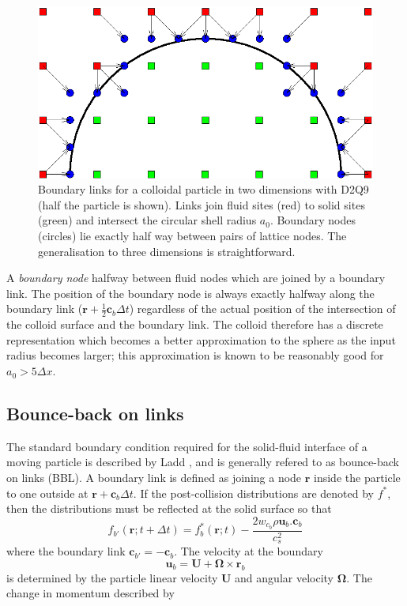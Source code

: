 \begin{figure}[tb]
\begin{center}
\includegraphics{xfig/colloidhalflinksnew.eps}
\end{center}
\caption{Boundary links for a colloidal particle in two dimensions
with D2Q9 (half the particle is shown). Links join fluid sites (red)
to solid sites (green) and
intersect the circular shell radius $a_0$. Boundary nodes (circles)
lie exactly half way between pairs of lattice nodes. The generalisation
to three dimensions is straightforward.}
\label{fig_coll2}
\end{figure}

A \textit{boundary node} halfway between fluid nodes which are joined
by a boundary link. The position of the boundary node is always
exactly halfway along the boundary link ($\mathbf{r} + \frac{1}{2}\mathbf{c}_b
\Delta t$) regardless of the actual position of the intersection
of the colloid surface and the boundary link.
The colloid therefore has a discrete representation which becomes a
better approximation to the sphere as the input radius becomes larger;
this approximation is known to be reasonably good for $a_0 > 5\Delta x$.



\subsection{Bounce-back on links}

The standard boundary condition required for the solid-fluid
interface of a moving particle is described by Ladd \cite{l94b},
and is generally refered to as bounce-back on links (BBL).
A boundary link is defined as joining a node $\mathbf{r}$
inside the particle to one outside at $\mathbf{r} + \mathbf{c}_b \Delta t$.
If the post-collision distributions are denoted by $f^\ast$, then
the distributions must be reflected at the solid surface so that
\begin{equation}
\label{eq:bbl1}
f_{b'}(\mathbf{r}; t + \Delta t) = f_b^\ast (\mathbf{r}; t)
- \frac{2w_{c_b} \rho \mathbf{u}_b.\mathbf{c}_b}{c_s^2}
\end{equation}
where the boundary link $\mathbf{c}_{b'} = -\mathbf{c}_b$. The velocity
at the boundary
\begin{equation}
\label{eq:ub}
\mathbf{u}_b = \mathbf{U} + \mathbf{\Omega}\times\mathbf{r}_b
\end{equation}
is determined by the particle linear velocity $\mathbf{U}$ and angular
velocity $\mathbf{\Omega}$. The change in momentum described by

